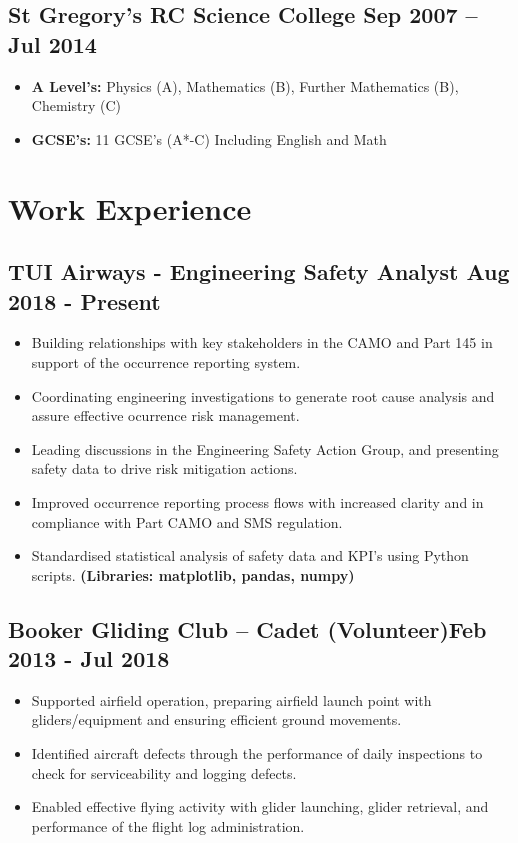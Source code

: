 \documentclass[a4paper,9pt]{article}
\begin{document}
\subsection*{\textbf{St Gregory’s RC Science College} \hfill  Sep 2007 – Jul 2014}
\begin{itemize}[noitemsep]
    \item \textbf{A Level's:} Physics (A), Mathematics (B), Further Mathematics (B), Chemistry (C)
    \item \textbf{GCSE’s:} 11 GCSE’s (A*-C) Including English and Math
\end{itemize}

\section*{Work Experience}
\subsection*{\textbf{TUI Airways - Engineering Safety Analyst} \hfill  Aug 2018 - Present}
\begin{itemize}[noitemsep]
	\item Building relationships with key stakeholders in the CAMO and Part 145 in support of the occurrence reporting system.
	\item Coordinating engineering investigations to generate root cause analysis and assure effective ocurrence risk management.
	\item Leading discussions in the Engineering Safety Action Group, and presenting safety data to drive risk mitigation actions.
	\item Improved occurrence reporting process flows with increased clarity and in compliance with Part CAMO and SMS regulation.
	\item Standardised statistical analysis of safety data and KPI's using Python scripts. \textbf{(Libraries: matplotlib, pandas, numpy)}
\end{itemize}

\subsection*{\textbf{Booker Gliding Club – Cadet (Volunteer)}\hfill Feb 2013 - Jul 2018}
\begin{itemize}[noitemsep]

	\item Supported airfield operation, preparing airfield launch point with gliders/equipment and ensuring efficient ground movements.
	\item Identified aircraft defects through the performance of daily inspections to check for serviceability and logging defects.
	\item Enabled effective flying activity with glider launching, glider retrieval, and performance of the flight log administration.
\end{itemize}
\end{document}
